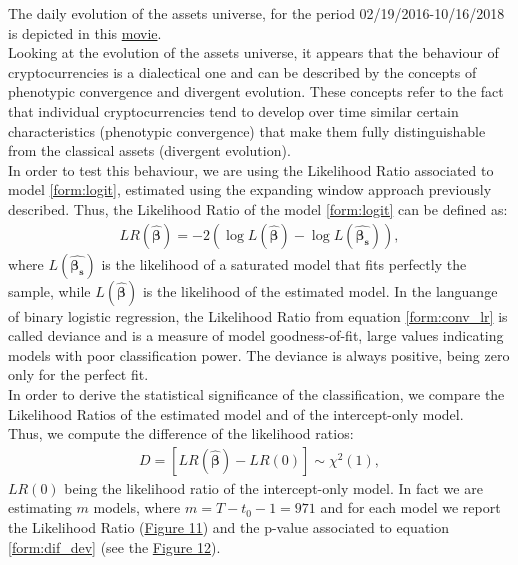 The daily evolution of the assets universe, for the period 02/19/2016-10/16/2018 is depicted in this \href{run:Fig/Crypto_movie.mp4}{movie}.\\
\indent{} Looking at the evolution of the assets universe, it appears that the behaviour of cryptocurrencies is a dialectical one and can be described by the concepts of phenotypic convergence and divergent evolution.
These concepts refer to the fact that individual cryptocurrencies tend to develop over time similar certain characteristics (phenotypic convergence) that make them fully distinguishable from the classical assets (divergent evolution).\\
In order to test this behaviour, we are using the Likelihood Ratio associated to model  \ref{form:logit}, estimated using the expanding window approach previously described.
Thus, the Likelihood Ratio of the model \ref{form:logit} can be defined as:
\begin{align} \label{form:conv_lr}
LR(\widehat{\boldsymbol{\beta}})=-2 (\log L(\widehat{\boldsymbol{\beta}})- \log L(\widehat{\boldsymbol{\beta_s}})),
\end{align}
where $L(\widehat{\boldsymbol{\beta_s}})$ is the likelihood of a saturated model that fits perfectly the sample, while  $L(\widehat{\boldsymbol{\beta}})$ is the likelihood of the estimated model.
In the languange of binary logistic regression, the Likelihood Ratio from equation \ref{form:conv_lr} is called deviance \citep{hosmer.2010} and is a measure of model goodness-of-fit, large values indicating models with poor classification power. The deviance is always positive, being zero only for the perfect fit.\\
In order to derive the statistical significance of the classification, we compare the Likelihood Ratios of the estimated model and of the intercept-only model.\\
Thus, we compute the difference of the likelihood ratios: 
\begin{align} \label{form:dif_dev}
D=[LR(\widehat{\boldsymbol{\beta}})-LR(0)]\sim \chi^{2}(1),
\end{align}
$LR(0)$ being the likelihood ratio of the intercept-only model. 
In fact we are estimating $m$ models, where $m=T-t_0-1=971$ and for each model we report the Likelihood Ratio (\hyperref[fig:figure_11]{Figure 11}) and the p-value associated to equation \ref{form:dif_dev} (see the \hyperref[fig:figure_12]{Figure 12}).
